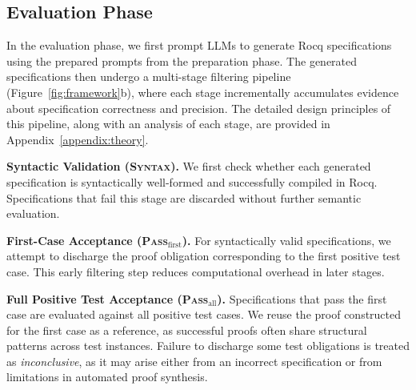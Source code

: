 


\subsection{Evaluation Phase}

In the evaluation phase, we first prompt LLMs to generate Rocq specifications using the prepared prompts from the preparation phase. The generated specifications then undergo a multi-stage filtering pipeline (Figure~\ref{fig:framework}b), where each stage incrementally accumulates evidence about specification correctness and precision. The detailed design principles of this pipeline, along with an analysis of each stage, are provided in Appendix~\ref{appendix:theory}.

\textbf{Syntactic Validation (\textsc{Syntax}).}
We first check whether each generated specification is syntactically well-formed and successfully compiled in Rocq. Specifications that fail this stage are discarded without further semantic evaluation.

\textbf{First-Case  Acceptance (\textsc{Pass}$_{\text{first}}$).} For syntactically valid specifications, we attempt to discharge the proof obligation corresponding to the first positive test case. This early filtering step reduces computational overhead in later stages.

\textbf{Full Positive Test Acceptance (\textsc{Pass}$_{\text{all}}$).}
Specifications that pass the first case are evaluated against all positive test cases. We reuse the proof constructed for the first case as a reference, as successful proofs often share structural patterns across test instances. Failure to discharge some test obligations is treated as \emph{inconclusive}, as it may arise either from an incorrect specification or from limitations in automated proof synthesis.





